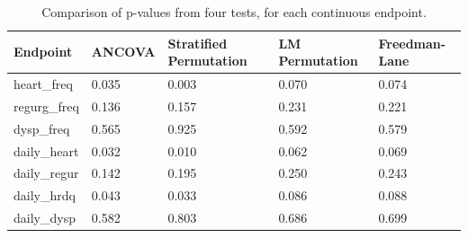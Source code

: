 \documentclass[12pt]{article}
\begin{document}
\begin{table}[]
\centering
\begin{tabular}{l|LLLL}
Endpoint      & ANCOVA & Stratified Permutation & LM Permutation & Freedman-Lane \\ \hline
heart\_freq   & 0.035                      & 0.003                                                                                & 0.070                                                                        & 0.074                                                                       \\
regurg\_freq  & 0.136                      & 0.157                                                                                & 0.231                                                                        & 0.221                                                                        \\
dysp\_freq    & 0.565                      & 0.925                                                                               & 0.592                                                                        & 0.579                                                                        \\
daily\_heart & 0.032                      & 0.010                                                                                & 0.062                                                                        & 0.069                                                                        \\
daily\_regur  & 0.142                      & 0.195                                                                                & 0.250                                                                        & 0.243                                                                        \\
daily\_hrdq   & 0.043                      & 0.033                                                                                & 0.086                                                                        & 0.088                                                                        \\
daily\_dysp   & 0.582                      & 0.803                                                                                & 0.686                                                                        & 0.699                                                                        \\
\hline
\end{tabular}
\caption{Comparison of p-values from four tests, for each continuous endpoint.} 
\label{tab:clinical_pvalues}
\end{table}
\end{document}
